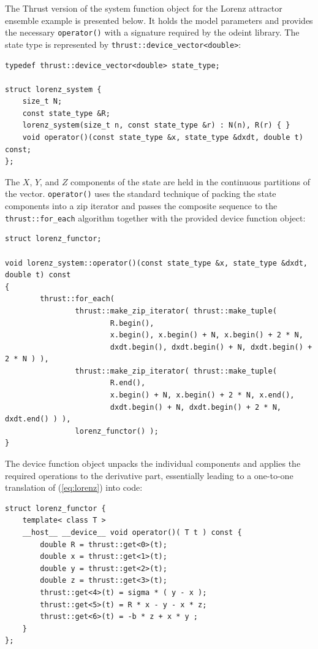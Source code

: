 \documentclass[final]{siamltex}
\newcommand{\code}[1]{\lstinline$#1$}
\newcommand{\eqref}[1]{(\ref{#1})}
\begin{document}
The Thrust version of the system function object for the Lorenz attractor ensemble
example is presented below. It holds the model parameters and provides the necessary
\code{operator()} with a signature required by the odeint library. The state
type is represented by \code{thrust::device_vector<double>}:
\begin{lstlisting}
typedef thrust::device_vector<double> state_type;

struct lorenz_system {
    size_t N;
    const state_type &R;
    lorenz_system(size_t n, const state_type &r) : N(n), R(r) { }
    void operator()(const state_type &x, state_type &dxdt, double t) const;
};
\end{lstlisting}
The $X$, $Y$, and $Z$ components of the state are held in the continuous
partitions of the vector.  \code{operator()} uses the standard technique of
packing the state components into a zip iterator and passes the composite
sequence to the \code{thrust::for_each} algorithm together with the provided
device function object:
\begin{lstlisting}[firstnumber=12]
struct lorenz_functor;

void lorenz_system::operator()(const state_type &x, state_type &dxdt, double t) const
{
        thrust::for_each(
                thrust::make_zip_iterator( thrust::make_tuple(
                        R.begin(),
                        x.begin(), x.begin() + N, x.begin() + 2 * N,
                        dxdt.begin(), dxdt.begin() + N, dxdt.begin() + 2 * N ) ),
                thrust::make_zip_iterator( thrust::make_tuple(
                        R.end(),
                        x.begin() + N, x.begin() + 2 * N, x.end(),
                        dxdt.begin() + N, dxdt.begin() + 2 * N, dxdt.end() ) ),
                lorenz_functor() );
}
\end{lstlisting}
The device function object unpacks the individual components and applies the required
operations to the derivative part, essentially leading to a one-to-one
translation of \eqref{eq:lorenz} into code:
\begin{lstlisting}[firstnumber=last]
struct lorenz_functor {
    template< class T >
    __host__ __device__ void operator()( T t ) const {
        double R = thrust::get<0>(t);
        double x = thrust::get<1>(t);
        double y = thrust::get<2>(t);
        double z = thrust::get<3>(t);
        thrust::get<4>(t) = sigma * ( y - x );
        thrust::get<5>(t) = R * x - y - x * z;
        thrust::get<6>(t) = -b * z + x * y ;
    }
};
\end{lstlisting}
\end{document}

